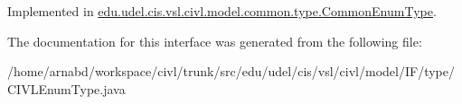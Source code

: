 Implemented in \hyperlink{classedu_1_1udel_1_1cis_1_1vsl_1_1civl_1_1model_1_1common_1_1type_1_1CommonEnumType_a32c48fbba9ca4711284e20504268bf65}{edu.\+udel.\+cis.\+vsl.\+civl.\+model.\+common.\+type.\+Common\+Enum\+Type}.



The documentation for this interface was generated from the following file\+:\begin{DoxyCompactItemize}
\item 
/home/arnabd/workspace/civl/trunk/src/edu/udel/cis/vsl/civl/model/\+I\+F/type/C\+I\+V\+L\+Enum\+Type.\+java\end{DoxyCompactItemize}

